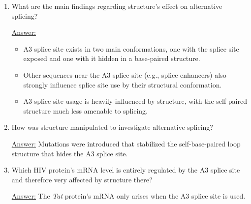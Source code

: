 \documentclass{article}
\newenvironment{QandA}{\begin{enumerate}[label=\bfseries Q\arabic*.]}
                       {\end{enumerate}}
\newenvironment{answered}{\par\normalfont\underline{Answer:}}{}
\begin{document}
\begin{QandA}
    \begin{answered}
    The \textbf{A3 splice site}'s structure was studied to assess the structural impact on alternative splicing?
    \end{answered}
  \item{What are the main findings regarding structure's effect on alternative splicing?}
    \begin{answered}
    \begin{itemize}
      \item{A3 splice site exists in two main conformations, one with the splice site exposed and one with it hidden in a base-paired structure.}
      \item{Other sequences near the A3 splice site (e.g., splice enhancers) also strongly influence splice site use by their structural conformation.}
      \item{A3 splice site usage is heavily influenced by structure, with the self-paired structure much less amenable to splicing.}
    \end{itemize}
    \end{answered}
  \item{How was structure manipulated to investigate alternative splicing?}
    \begin{answered}
    Mutations were introduced that stabilized the self-base-paired loop structure that hides the A3 splice site.
    \end{answered}
  \item{Which HIV protein's mRNA level is entirely regulated by the A3 splice site and therefore very affected by structure there?}
    \begin{answered}
    The \textit{Tat} protein's mRNA only arises when the A3 splice site is used.
    \end{answered}
\end{QandA}
\end{document}
